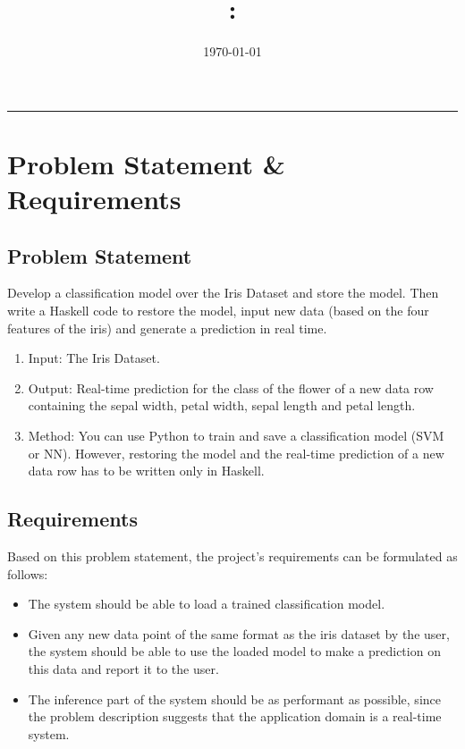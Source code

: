 \documentclass[12pt]{article}
\title{\code: \name}
\author{\me}
\date{\today}
\begin{document}
\maketitle
\hrule \bigskip

\section{Problem Statement \& Requirements}
\subsection{Problem Statement}
Develop a classification model over the Iris Dataset and store the model. Then write a Haskell code to restore the model, input new data (based on the four features of the iris) and generate a prediction in real time.
\begin{enumerate}
	\item Input: The Iris Dataset.
	\item Output: Real-time prediction for the class of the flower of a new data row containing the sepal width, petal width, sepal length and petal length.
	\item Method: You can use Python to train and save a classification model (SVM or NN). However, restoring the model and the real-time prediction of a new data row has to be written only in Haskell.
\end{enumerate}

\subsection{Requirements}
Based on this problem statement, the project's requirements can be formulated as follows:
\begin{itemize}
	\item The system should be able to load a trained classification model.
	\item Given any new data point of the same format as the iris dataset by the user, the system should be able to use the loaded model to make a prediction on this data and report it to the user.
	\item The inference part of the system should be as performant as possible, since the problem description suggests that the application domain is a real-time system.
\end{itemize}
\end{document}
